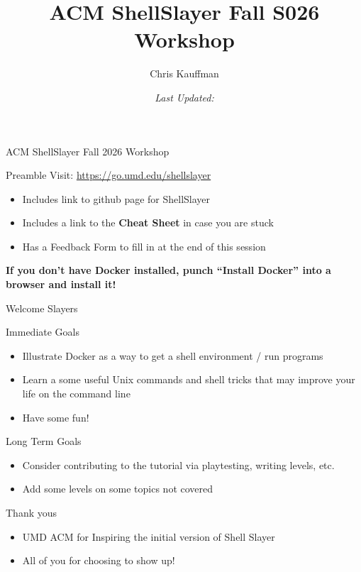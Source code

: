 \documentclass[mathserif]{beamer}
\author{Chris Kauffman}
\date{\it Last Updated: \newline }
\title{ACM ShellSlayer Fall S026 Workshop}
\begin{document}
\maketitle
\begin{frame}[label={sec:org7798519}]{ACM ShellSlayer Fall 2026 Workshop}
\begin{block}{Preamble}
Visit: \url{https://go.umd.edu/shellslayer}
\begin{itemize}
\item Includes link to github page for ShellSlayer
\item Includes a link to the \textbf{Cheat Sheet} in case you are stuck
\item Has a Feedback Form to fill in at the end of this session
\end{itemize}

\vspace{.2in}

\textbf{If you don't have Docker installed, punch ``Install Docker'' into a
browser and install it!}
\end{block}
\end{frame}
\begin{frame}[label={sec:org9998dd3}]{Welcome Slayers}
\begin{block}{Immediate Goals}
\begin{itemize}
\item Illustrate Docker as a way to get a shell environment / run programs
\item Learn a some useful Unix commands and shell tricks that may improve
your life on the command line
\item Have some fun!
\end{itemize}
\end{block}
\begin{block}{Long Term Goals}
\begin{itemize}
\item Consider contributing to the tutorial via playtesting, writing
levels, etc.
\item Add some levels on some topics not covered
\end{itemize}
\end{block}
\begin{block}{Thank yous}
\begin{itemize}
\item UMD ACM for Inspiring the initial version of Shell Slayer
\item All of you for choosing to show up!
\end{itemize}
\end{block}
\end{frame}
\end{document}
